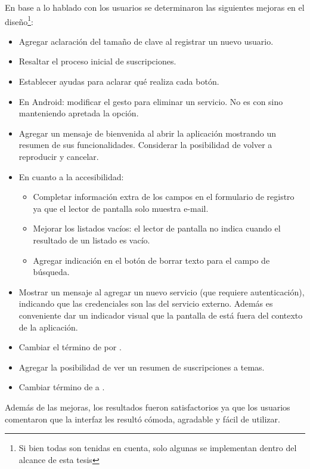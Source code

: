 En base a lo hablado con los usuarios se determinaron las siguientes mejoras en el diseño\footnote{Si bien todas son tenidas en cuenta, solo algunas se implementan dentro del alcance de esta tesis}:
\begin{itemize}
\item Agregar aclaración del tamaño de clave al registrar un nuevo usuario. 
\item Resaltar el proceso inicial de suscripciones.
\item Establecer ayudas para aclarar qué realiza cada botón.
\item En Android: modificar el gesto para eliminar un servicio. No es con  sino manteniendo apretada la opción.
\item Agregar un mensaje de bienvenida al abrir la aplicación mostrando un resumen de sus funcionalidades. Considerar la posibilidad de volver a reproducir y cancelar.
\item En cuanto a la accesibilidad:
\begin{itemize}
\item Completar información extra de los campos en el formulario de registro ya que el lector de pantalla solo muestra e-mail.
\item Mejorar los listados vacíos: el lector de pantalla no indica cuando el resultado de un listado es vacío.
\item Agregar indicación en el botón de borrar texto para el campo de búsqueda. 
\end{itemize}
\item Mostrar un mensaje al agregar un nuevo servicio (que requiere autenticación), indicando que las credenciales son las del servicio externo. Además es conveniente dar un indicador visual que la pantalla de   está fuera del contexto de la aplicación.
\item Cambiar el término de  por .
\item Agregar la posibilidad de ver un resumen de suscripciones a temas.
\item Cambiar término de  a .
\end{itemize}

Además de las mejoras, los resultados fueron satisfactorios ya que los usuarios comentaron que la interfaz les resultó cómoda, agradable y fácil de utilizar.
